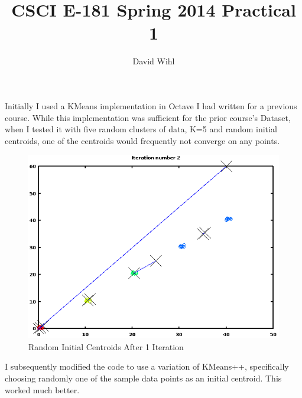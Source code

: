 \documentclass[11pt, oneside]{article}   	%
\title{CSCI E-181 Spring 2014 Practical 1}
\author{David Wihl}
\begin{document}
\maketitle

\par Initially I used a KMeans implementation in Octave I had written for a previous course. While this implementation was sufficient for the prior course's Dataset, when I tested it with five random clusters of data, K=5 and random initial centroids, one of the centroids would frequently not converge on any points.

\begin{figure}[h!]
\centering
\includegraphics[scale=0.6]{randominitialClusters}
\caption{Random Initial Centroids After 1 Iteration}
\end{figure}

I subsequently modified the code to use a variation of KMeans++, specifically choosing randomly one of the sample data points as an initial centroid. This worked much better.
\end{document}
